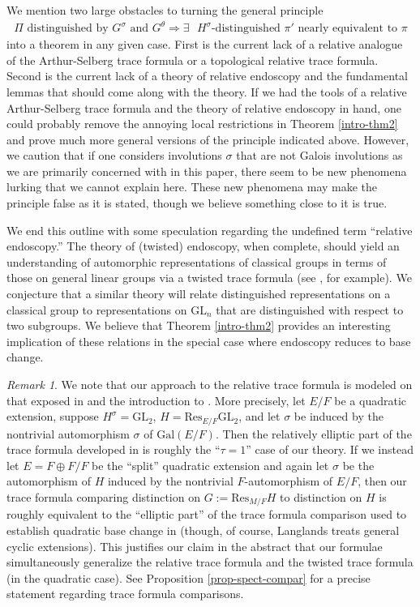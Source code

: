 \documentclass[12pt]{amsart}
\theoremstyle{remark}
\newtheorem*{rem}{Remark}
\numberwithin{equation}{section}
\newcommand{\GL}{\mathrm{GL}}
\newcommand{\Gal}{\mathrm{Gal}}
\theoremstyle{definition}
\numberwithin{equation}{subsection}
\begin{document}
We mention two large obstacles to turning the general principle
\begin{align*}
\Pi \textrm{ distinguished by }G^{\sigma} \textrm{ and } G^{\theta}
 \Rightarrow
 \exists \textrm{ }H^{\sigma}\textrm{-distinguished }\pi' \textrm{ nearly equivalent to }\pi
\end{align*}
into a theorem in any given case.  First is the current lack of
a relative analogue of the Arthur-Selberg trace formula or a topological relative trace formula.
Second is the current lack of a theory of relative endoscopy and the fundamental lemmas that should come along with the theory.  If we had the tools of a relative Arthur-Selberg trace formula and the theory of relative endoscopy in hand, one could probably remove the annoying local restrictions in Theorem \ref{intro-thm2} and prove much more general versions of the principle indicated above.  However, we caution that if one considers involutions $\sigma$ that are not Galois involutions as we are primarily concerned with in this paper, there seem to be new phenomena lurking that we cannot explain here.  These new phenomena may make the principle false as it is stated,
  though we believe something close to it is true.


We end this outline with some speculation regarding the undefined term ``relative endoscopy.''  The theory of (twisted) endoscopy, when complete, should yield an understanding of automorphic representations of classical groups in terms of those on general linear groups via a twisted trace formula (see \cite[\S 30]{ArthurIntro}, for example).  We conjecture that a similar theory will relate distinguished representations on a classical group to representations on $\GL_n$ that are distinguished with respect to two subgroups.  We believe that Theorem \ref{intro-thm2} provides an interesting implication of these relations in the special case where endoscopy reduces to base change.

 \begin{rem}  We note that our approach to
 the relative trace formula is modeled on that exposed in \cite{JacquetLai} and
 the introduction to \cite{JLR}.  More precisely, let $E/F$ be a quadratic extension, suppose
 $H^{\sigma}=\GL_2$, $H=\mathrm{Res}_{E/F}\GL_2$, and let $\sigma$ be induced by the nontrivial automorphism
 $\sigma$ of $\Gal(E/F)$.  Then the relatively elliptic part of the trace formula developed in \cite{JacquetLai}
 is roughly the ``$\tau=1$'' case of our theory.  If we instead let $E=F \oplus F/F$ be the ``split''
 quadratic extension and again let $\sigma$ be the automorphism of $H$ induced by the nontrivial $F$-automorphism
 of $E/F$, then our trace formula comparing distinction on $G:=\mathrm{Res}_{M/F}H$ to distinction on $H$
 is roughly equivalent to the ``elliptic part'' of the trace formula comparison used to establish quadratic base
 change in \cite{LanglandsBC} (though, of course, Langlands treats general cyclic extensions).  This justifies our claim
 in the abstract that our formulae simultaneously generalize the relative trace formula and the twisted trace formula (in the quadratic case).
 See Proposition \ref{prop-spect-compar} for a precise statement regarding trace formula comparisons.
\end{rem}
\end{document}
